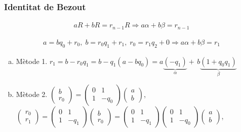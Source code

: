 \subsubsection*{Identitat de Bezout}
\begin{align}
    aR + bR = r_{n-1}R \Rightarrow a \alpha + b \beta = r_{n-1}
\end{align}
\begin{example}
\begin{align*}
    a = b q_{0} + r_{0}, \; b = r_{0} q_{1} + r_{1}, \; r_{0} = r_{1} q_{2} + 0 \Rightarrow a \alpha + b \beta = r_{1}
\end{align*}
\end{example}
\begin{enumerate}[a)]
    \item Mètode 1.
        \subitem $ r_{1} = b - r_{0} q_{1} = b - q_{1} (a - b q_{0}) = a \underbrace{( - q_{1})}_{\alpha} + \, b \underbrace{( 1 + q_{0} q_{1})}_{\beta}$
    \item Mètode 2.
        \subitem $\begin{pmatrix} b \\ r_{0} \end{pmatrix} = \begin{pmatrix} 0 & 1 \\ 1 & -q_{0} \end{pmatrix} \begin{pmatrix} a \\ b \end{pmatrix}$, 
        \subitem $\begin{pmatrix} r_{0} \\ r_{1} \end{pmatrix} = \begin{pmatrix} 0 & 1 \\ 1 & -q_{1} \end{pmatrix} \begin{pmatrix} b \\ r_{0} \end{pmatrix} = \begin{pmatrix} 0 & 1 \\ 1 & -q_{1} \end{pmatrix} \begin{pmatrix} 0 & 1 \\ 1 & -q_{0} \end{pmatrix} \begin{pmatrix} a \\ b \end{pmatrix}$,

\end{enumerate}
